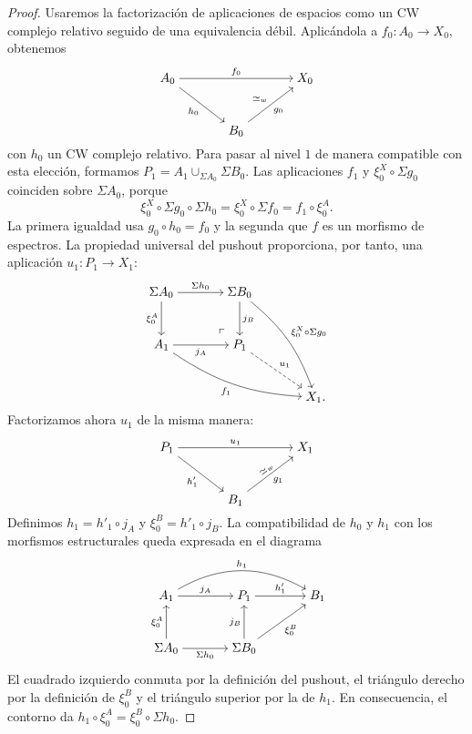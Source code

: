 \begin{proof}
Usaremos la factorización de aplicaciones de espacios como un CW complejo relativo seguido de una equivalencia débil. Aplicándola a $f_0\colon A_0\to X_0$, obtenemos
\[
\begin{tikzcd}[cramped,column sep=large,row sep=large]
A_0 \arrow[rr,"f_0"] \arrow[dr,"h_0"'] && X_0\\
& B_0 \arrow[ur,"g_0"',"\simeq_w"] &
\end{tikzcd}
\]
con $h_0$ un CW complejo relativo. Para pasar al nivel $1$ de manera compatible con esta elección, formamos $P_1=A_1\cup_{\Sigma A_0}\Sigma B_0$. Las aplicaciones $f_1$ y $\xi^X_0\circ\Sigma g_0$ coinciden sobre $\Sigma A_0$, porque
\[
\xi^X_0\circ\Sigma g_0\circ\Sigma h_0
=\xi^X_0\circ\Sigma f_0
=f_1\circ\xi^A_0.
\]
La primera igualdad usa $g_0\circ h_0=f_0$ y la segunda que $f$ es un morfismo de espectros. La propiedad universal del pushout proporciona, por tanto, una aplicación $u_1\colon P_1\to X_1$:
\[
\begin{tikzcd}[cramped,column sep=large,row sep=large]
\Sigma A_0 \arrow[r,"\Sigma h_0"] \arrow[d,"\xi^A_0"']
& \Sigma B_0 \arrow[d,"j_B"]
\arrow[ddr,bend left=15,"\xi^X_0\circ\Sigma g_0"] &\\
A_1 \arrow[r,"j_A"'] \arrow[drr,bend right=15,"f_1"']
& P_1 \arrow[ul,phantom,"\ulcorner",very near start]
\arrow[dr,dashed,"u_1"] &\\
&& X_1.
\end{tikzcd}
\]
Factorizamos ahora $u_1$ de la misma manera:
\[
\begin{tikzcd}[cramped,column sep=large,row sep=large]
P_1 \arrow[rr,"u_1"] \arrow[dr,"h'_1"'] && X_1\\
& B_1 \arrow[ur,"g_1"',"\simeq_w" sloped] &
\end{tikzcd}
\]
Definimos $h_1=h'_1\circ j_A$ y $\xi^B_0=h'_1\circ j_B$. La compatibilidad de $h_0$ y $h_1$ con los morfismos estructurales queda expresada en el diagrama
\[
\begin{tikzcd}[cramped,column sep=large,row sep=large]
A_1 \arrow[r,"j_A"] \arrow[rr,bend left=30,"h_1"]
& P_1 \arrow[r,"h'_1"] & B_1\\
\Sigma A_0 \arrow[u,"\xi^A_0"] \arrow[r,"\Sigma h_0"']
& \Sigma B_0 \arrow[u,"j_B"] \arrow[ur,"\xi^B_0"'] &
\end{tikzcd}
\]
El cuadrado izquierdo conmuta por la definición del pushout, el triángulo derecho por la definición de $\xi^B_0$ y el triángulo superior por la de $h_1$. En consecuencia, el contorno da $h_1\circ\xi^A_0=\xi^B_0\circ\Sigma h_0$.


\end{proof}
